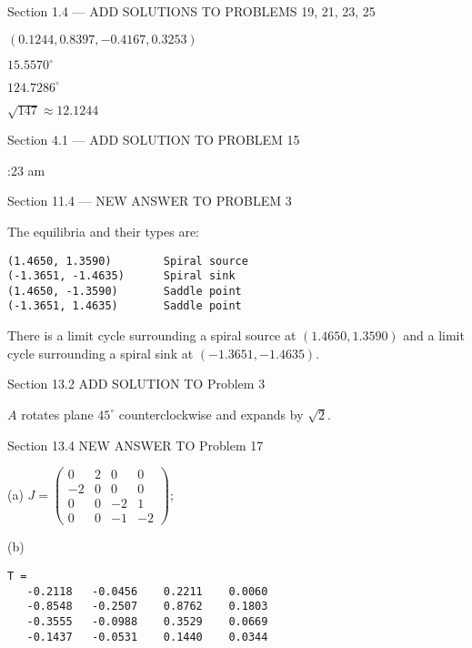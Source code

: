 


\newpage

Section 1.4 --- ADD SOLUTIONS TO PROBLEMS 19, 21, 23, 25


  $(0.1244, 0.8397, -0.4167, 0.3253)$

 $15.5570^\circ$

 $124.7286^\circ$

 $\sqrt{147} \approx 12.1244$

\vspace{0.2in}

Section 4.1 ---  ADD SOLUTION TO PROBLEM 15

:23 am

\vspace{0.2in}

Section 11.4 --- NEW ANSWER TO PROBLEM 3

The equilibria and their types are:
\begin{verbatim}
(1.4650, 1.3590)        Spiral source           
(-1.3651, -1.4635)      Spiral sink             
(1.4650, -1.3590)       Saddle point           
(-1.3651, 1.4635)       Saddle point 
\end{verbatim}
There is a limit cycle surrounding a spiral source at $(1.4650, 1.3590)$ 
and a limit cycle surrounding a spiral sink at $(-1.3651, -1.4635)$.

\vspace{0.2in}

Section 13.2  ADD SOLUTION TO Problem 3

$A$ rotates plane $45^{\circ}$ counterclockwise and expands by $\sqrt{2}$.


\vspace{0.2in}

Section 13.4  NEW ANSWER TO Problem 17

\vspace{0.1in}

(a) \ans 
$ J = \left(\begin{array}{rrrr}
 0 & 2 &  0 &  0 \\
-2 & 0 &  0 &  0 \\
 0 & 0 & -2 &  1 \\
 0 & 0 & -1 & -2 \end{array}\right)$;

(b) \ans   \begin{verbatim}
T =
   -0.2118   -0.0456    0.2211    0.0060
   -0.8548   -0.2507    0.8762    0.1803
   -0.3555   -0.0988    0.3529    0.0669
   -0.1437   -0.0531    0.1440    0.0344
\end{verbatim}


